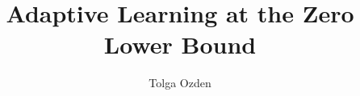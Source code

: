 \documentclass[12pt,reqno]{article}
\title{Adaptive Learning at the Zero Lower Bound}
\author{Tolga Ozden}
\numberwithin{equation}{section}
\begin{document}

\end{document}
